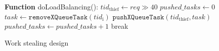 \begin{algorithm}[bth]
\begin{algorithmic}[1]
    \item[{\bf Function} doLoadBalancing():]{}
    \STATE $tid_{\text{thief}} \gets req\gg40$
    \STATE $pushed\_tasks \gets 0$
        \STATE $task \gets \texttt{removeXQueueTask}(tid_{\text{i}})$
        \STATE $\texttt{pushXQueueTask}(tid_{\text{thief}}, task)$
        \STATE $pushed\_tasks \gets pushed\_tasks + 1$
            \STATE break
        \ENDIF
    \ENDWHILE
\end{algorithmic}

\vspace{1ex}

\caption{Work stealing design}
\label{algo:ws-logic}
\end{algorithm}
